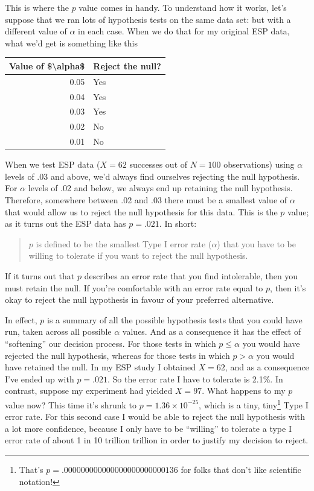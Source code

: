 \documentclass[
]{book}
\begin{document}
This is where the \(p\) value comes in handy. To understand how it works, let's suppose that we ran lots of hypothesis tests on the same data set: but with a different value of \(\alpha\) in each case. When we do that for my original ESP data, what we'd get is something like this

\begin{tabular}{r|l}
\hline
Value of \$\textbackslash{}alpha\$ & Reject the null?\\
\hline
0.05 & Yes\\
\hline
0.04 & Yes\\
\hline
0.03 & Yes\\
\hline
0.02 & No\\
\hline
0.01 & No\\
\hline
\end{tabular}

When we test ESP data (\(X=62\) successes out of \(N=100\) observations) using \(\alpha\) levels of .03 and above, we'd always find ourselves rejecting the null hypothesis. For \(\alpha\) levels of .02 and below, we always end up retaining the null hypothesis. Therefore, somewhere between .02 and .03 there must be a smallest value of \(\alpha\) that would allow us to reject the null hypothesis for this data. This is the \(p\) value; as it turns out the ESP data has \(p = .021\). In short:

\begin{quote}
\(p\) is defined to be the smallest Type I error rate (\(\alpha\)) that you have to be willing to tolerate if you want to reject the null hypothesis.
\end{quote}

If it turns out that \(p\) describes an error rate that you find intolerable, then you must retain the null. If you're comfortable with an error rate equal to \(p\), then it's okay to reject the null hypothesis in favour of your preferred alternative.

In effect, \(p\) is a summary of all the possible hypothesis tests that you could have run, taken across all possible \(\alpha\) values. And as a consequence it has the effect of ``softening'' our decision process. For those tests in which \(p \leq \alpha\) you would have rejected the null hypothesis, whereas for those tests in which \(p > \alpha\) you would have retained the null. In my ESP study I obtained \(X=62\), and as a consequence I've ended up with \(p = .021\). So the error rate I have to tolerate is 2.1\%. In contrast, suppose my experiment had yielded \(X=97\). What happens to my \(p\) value now? This time it's shrunk to \(p = 1.36 \times 10^{-25}\), which is a tiny, tiny\footnote{That's \(p = .000000000000000000000000136\) for folks that don't like scientific notation!} Type I error rate. For this second case I would be able to reject the null hypothesis with a lot more confidence, because I only have to be ``willing'' to tolerate a type I error rate of about 1 in 10 trillion trillion in order to justify my decision to reject.
\end{document}
